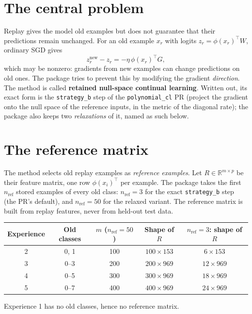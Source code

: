 \documentclass[11pt,a4paper]{article}
\newcommand{\R}{\mathbb{R}}
\newcommand{\code}[1]{\texttt{#1}}
\begin{document}
\section{The central problem}

Replay gives the model old examples but does not guarantee that their predictions remain unchanged. For an old example $x_r$ with logits $z_r=\phi(x_r)^\top W$, ordinary SGD gives
\[
z_r^{\text{new}}-z_r=-\eta\,\phi(x_r)^\top G,
\]
which may be nonzero: gradients from new examples can change predictions on old ones. The package tries to prevent this by modifying the gradient \emph{direction}. The method is called \textbf{retained null-space continual learning}. Written out, its exact form is the \code{strategy\_b} step of the \code{polynomial\_cl} PR (project the gradient onto the null space of the reference inputs, in the metric of the diagonal rate); the package also keeps two \emph{relaxations} of it, named as such below.

\section{The reference matrix}

The method selects old replay examples as \emph{reference examples}. Let $R\in\R^{m\times p}$ be their feature matrix, one row $\phi(x_i)^\top$ per example. The package takes the first $n_{\text{ref}}$ stored examples of every old class: $n_{\text{ref}}=3$ for the exact \code{strategy\_b} step (the PR's default), and $n_{\text{ref}}=50$ for the relaxed variant. The reference matrix is built from replay features, never from held-out test data.

\begin{center}
\begin{tabular}{@{}ccccc@{}}
\toprule
Experience & Old classes & $m$ ($n_{\text{ref}}=50$) & Shape of $R$ & $n_{\text{ref}}=3$: shape of $R$\\
\midrule
2 & 0, 1 & 100 & $100\times153$ & $6\times153$\\
3 & 0--3 & 200 & $200\times969$ & $12\times969$\\
4 & 0--5 & 300 & $300\times969$ & $18\times969$\\
5 & 0--7 & 400 & $400\times969$ & $24\times969$\\
\bottomrule
\end{tabular}
\end{center}
Experience 1 has no old classes, hence no reference matrix.
\end{document}
